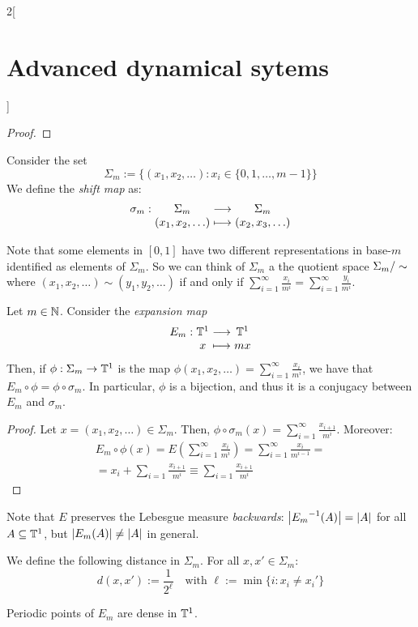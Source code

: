 \documentclass[../../../main_math.tex]{subfiles}
\begin{document}
\begin{multicols}{2}[\section{Advanced dynamical sytems}]
\begin{proof}
  \end{proof}
  \begin{definition}
    Consider the set $$\Sigma_m
      := \{(x_1,x_2,\ldots):x_i\in\{0,1,\ldots,m-1\}\}$$
    We define the \emph{shift map} as:
    $$
      \function{\sigma_m}{\Sigma_m}{\Sigma_m}{(x_1,x_2,\ldots)}{(x_2,x_3,\ldots)}
    $$
  \end{definition}
  \begin{remark}
    Note that some elements in $[0,1]$ have two different representations in base-$m$ identified as elements of $\Sigma_m$. So we can think of $\Sigma_m$ a the quotient space $\quot{\Sigma_m}{\sim}$ where $(x_1,x_2,\ldots)\sim (y_1,y_2,\ldots)$ if and only if $\sum_{i=1}^\infty \frac{x_i}{m^i}=\sum_{i=1}^\infty \frac{y_i}{m^i}$.
  \end{remark}
  \begin{proposition}
    Let $m\in\mathbb{N}$. Consider the \emph{expansion map}
    $$
      \function{E_m}{\TT^1}{\TT^1}{x}{mx}
    $$
    Then, if $\phi:\Sigma_m\to \mathbb{T}^1$ is the map $\phi(x_1,x_2,\ldots)=\sum_{i=1}^\infty \frac{x_i}{m^i}$, we have that $E_m\circ \phi=\phi\circ \sigma_m$. In particular, $\phi$ is a bijection, and thus it is a conjugacy between $E_m$ and $\sigma_m$.
  \end{proposition}
  \begin{proof}
    Let $x=(x_1,x_2,\ldots)\in \Sigma_m$. Then, $\phi\circ \sigma_m(x)=\sum_{i=1}^\infty \frac{x_{i+1}}{m^i}$. Moreover:
    \begin{multline*}
      E_m\circ \phi(x)=E\left(\sum_{i=1}^\infty \frac{x_i}{m^i}\right)=\sum_{i=1}^\infty \frac{x_i}{m^{i-1}}=\\=x_i+\sum_{i=1}\frac{x_{i+1}}{m^i}\equiv\sum_{i=1}\frac{x_{i+1}}{m^i}
    \end{multline*}
  \end{proof}
  \begin{remark}
    Note that $E$ preserves the Lebesgue measure \textit{backwards}: $\abs{{E_m}^{-1}(A)}=\abs{A}$ for all $A\subseteq \mathbb{T}^1$, but $\abs{E_m(A)}\ne \abs{A}$ in general.
  \end{remark}
  \begin{definition}
    We define the following distance in $\Sigma_m$. For all $x,x'\in\Sigma_m$:
    $$
      d(x,x'):=\frac{1}{2^\ell}\quad\text{with }\ell:=\min\{i:x_i\ne x_i'\}
    $$
  \end{definition}
  \begin{proposition}
    Periodic points of $E_m$ are dense in $\mathbb{T}^1$.
  \end{proposition}

\end{multicols}
\end{document}
